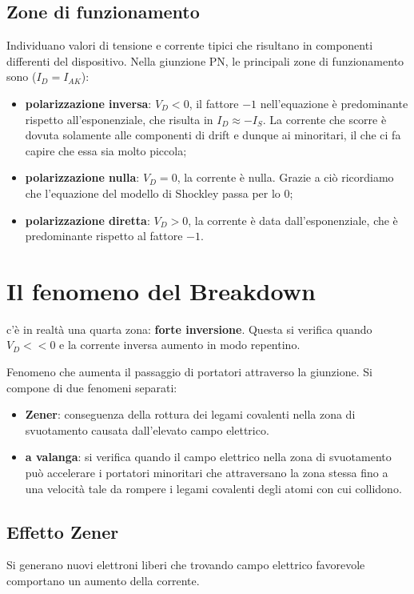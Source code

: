 \documentclass[11pt,a4paper,]{article}
\begin{document}
\subsection{Zone di funzionamento}
Individuano valori di tensione e corrente tipici che risultano in componenti differenti del dispositivo.
Nella giunzione PN, le principali zone di funzionamento sono ($I_D = I_{AK}$):
\begin{itemize}
    \item \textbf{polarizzazione inversa}: $V_D < 0$, il fattore $-1$ nell'equazione è predominante rispetto all'esponenziale, che risulta in $I_D \approx -I_S$. La corrente che scorre è dovuta solamente alle componenti di drift e dunque ai minoritari, il che ci fa capire che essa sia molto piccola;
    \item \textbf{polarizzazione nulla}: $V_D = 0$, la corrente è nulla. Grazie a ciò ricordiamo che l'equazione del modello di Shockley passa per lo $0$;
    \item \textbf{polarizzazione diretta}: $V_D > 0$, la corrente è data dall'esponenziale, che è predominante rispetto al fattore $-1$.
\end{itemize}

\section{Il fenomeno del Breakdown}
c'è in realtà una quarta zona: \textbf{forte inversione}. 
Questa si verifica quando $V_D<<0$ e la corrente inversa aumento in modo repentino. 
\begin{definizione}
    [Breakdown]
    Fenomeno che aumenta il passaggio di portatori attraverso la giunzione.
    Si compone di due fenomeni separati:
    \begin{itemize}
        \item \textbf{Zener}: conseguenza della rottura dei legami covalenti nella zona di svuotamento causata dall'elevato campo elettrico.
        \item \textbf{a valanga}: si verifica quando il campo elettrico nella zona di svuotamento può accelerare i portatori minoritari che attraversano la zona stessa fino a una velocità tale da rompere i legami covalenti degli atomi con cui collidono.
    \end{itemize}
\end{definizione}
\subsection{Effetto Zener}
Si generano nuovi elettroni liberi che trovando campo elettrico favorevole comportano un aumento della corrente.
\end{document}
